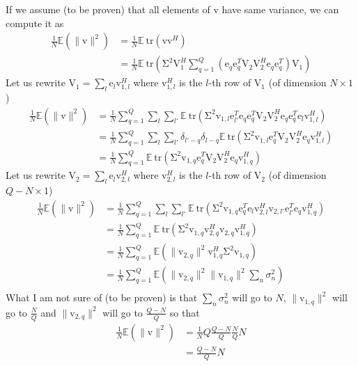 \documentclass[12pt]{article}
\newcommand{\vect}[1]{\boldsymbol{\mathrm{#1}}}
\newcommand{\mat}[1]{\boldsymbol{\mathrm{#1}}}
\newcommand{\tr}{\text{tr}}
\begin{document}
If we assume (to be proven) that all elements of $\vect{v}$ have same variance, we can compute it as
\begin{align*}
\frac{1}{N}\mathbb{E}\left(\|\vect{v}\|^2\right)&=\frac{1}{N}\mathbb{E}\ \tr\left(\vect{v}\vect{v}^H\right)\\
&=\frac{1}{N}\mathbb{E} \ \tr\left( \mat{\Sigma}^2\mat{V}_1^H  \sum_{q=1}^Q\left(\vect{e}_q \vect{e}_q^T \mat{V}_2 \mat{V}_2^H \vect{e}_{q} \vect{e}_{q}^T\right)\mat{V}_1 \right)
\end{align*}
Let us rewrite $\mat{V}_1=\sum_{l}\vect{e}_{l}\vect{v}_{1,l}^H$ where $\vect{v}_{1,l}^H$ is the $l$-th row of $\mat{V}_1$ (of dimension $N\times 1$)
\begin{align*}
\frac{1}{N}\mathbb{E}\left(\|\vect{v}\|^2\right)&=\frac{1}{N}\sum_{q=1}^Q\sum_{l}\sum_{l'}\mathbb{E} \ \tr\left( \mat{\Sigma}^2\vect{v}_{1,l}\vect{e}_{l'}^T  \vect{e}_q \vect{e}_q^T \mat{V}_2 \mat{V}_2^H \vect{e}_{q} \vect{e}_{q}^T\vect{e}_{l}\vect{v}_{1,l}^H \right)\\
&=\frac{1}{N}\sum_{q=1}^Q\sum_{l}\sum_{l'}\delta_{l'-q}\delta_{l-q} \mathbb{E} \ \tr\left( \mat{\Sigma}^2\vect{v}_{1,l}\vect{e}_q^T \mat{V}_2 \mat{V}_2^H \vect{e}_{q} \vect{v}_{1,l}^H \right)\\
&=\frac{1}{N}\sum_{q=1}^Q \mathbb{E} \ \tr\left( \mat{\Sigma}^2\vect{v}_{1,q}\vect{e}_q^T \mat{V}_2 \mat{V}_2^H \vect{e}_{q} \vect{v}_{1,q}^H \right)
\end{align*}
Let us rewrite $\mat{V}_2=\sum_{l}\vect{e}_{l}\vect{v}_{2,l}^H$ where $\vect{v}_{2,l}^H$ is the $l$-th row of $\mat{V}_2$ (of dimension $Q-N\times 1$)
\begin{align*}
\frac{1}{N}\mathbb{E}\left(\|\vect{v}\|^2\right)&=\frac{1}{N}\sum_{q=1}^Q\sum_l\sum_{l'} \mathbb{E} \ \tr\left( \mat{\Sigma}^2\vect{v}_{1,q}\vect{e}_q^T \vect{e}_{l}\vect{v}_{2,l}^H \vect{v}_{2,l'} \vect{e}_{l'}^T \vect{e}_{q} \vect{v}_{1,q}^H \right)\\
&=\frac{1}{N}\sum_{q=1}^Q \mathbb{E} \ \tr\left( \mat{\Sigma}^2\vect{v}_{1,q}\vect{v}_{2,q}^H \vect{v}_{2,q} \vect{v}_{1,q}^H \right)\\
&=\frac{1}{N}\sum_{q=1}^Q \mathbb{E} \left( \| \vect{v}_{2,q}\|^2\vect{v}_{1,q}^H\mat{\Sigma}^2\vect{v}_{1,q}  \right)\\
&=\frac{1}{N}\sum_{q=1}^Q \mathbb{E} \left( \| \vect{v}_{2,q}\|^2 \| \vect{v}_{1,q}\|^2 \sum_n \sigma_n^2  \right)\\
\end{align*}
What I am not sure of (to be proven) is that $\sum_n \sigma_n^2$ will go to $N$, $\| \vect{v}_{1,q}\|^2$ will go to $ \frac{N}{Q} $ and $\| \vect{v}_{2,q}\|^2$ will go to $ \frac{Q-N}{Q}$ so that
\begin{align*}
\frac{1}{N}\mathbb{E}\left(\|\vect{v}\|^2\right)&=\frac{1}{N} Q   \frac{Q-N}{Q} \frac{N}{Q} N  \\
&=   \frac{Q-N}{Q} N   \\
\end{align*}
\end{document}
